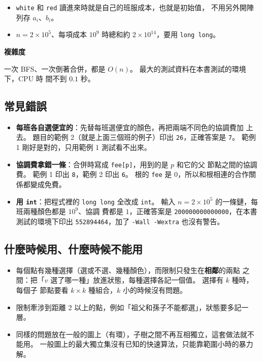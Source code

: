 
\begin{itemize}
\item \texttt{white} 和 \texttt{red} 讀進來時就是自己的班服成本，也就是初始值，
不用另外開陣列存 $a_i$、$b_i$。
\item $n = 2 \times 10^5$、每項成本 $10^9$ 時總和約 $2 \times 10^{14}$，要用
\texttt{long long}。
\end{itemize}

\textbf{複雜度}

一次 BFS、一次倒著合併，都是 $O(n)$。 最大的測試資料在本書測試的環境下，CPU 時
間不到 $0.1$ 秒。

\subsection{常見錯誤}

\begin{itemize}
\item \textbf{每班各自選便宜的}：先替每班選便宜的顏色，再把兩端不同色的協調費加
上去。 題目的範例 2（就是上面三個班的例子）印出 \texttt{26}，正確答案是
\texttt{7}。 範例 1 剛好是對的，只用範例 1 測試看不出來。
\item \textbf{協調費拿錯一條}：合併時寫成 \texttt{fee[p]}，用到的是 $p$ 和它的父
節點之間的協調費。 範例 1 印出 \texttt{8}，範例 2 印出 \texttt{6}。 根的
\texttt{fee} 是 $0$，所以和根相連的合作關係都變成免費。
\item \textbf{用 \texttt{int}}：把程式裡的 \texttt{long long} 全改成
\texttt{int}。 輸入 $n = 2 \times 10^5$ 的一條鏈，每班兩種顏色都是 $10^9$、協調
費都是 $1$，正確答案是 \texttt{200000000000000}，在本書測試的環境下印出
\texttt{552894464}，加了 \texttt{-Wall -Wextra} 也沒有警告。
\end{itemize}

\subsection{什麼時候用、什麼時候不能用}

\begin{itemize}
\item 每個點有幾種選擇（選或不選、幾種顏色），而限制只發生在\textbf{相鄰}的兩點
之間：把「$v$ 選了哪一種」放進狀態，每種選擇各記一個值。 選擇有 $k$ 種時，每個子
節點要看 $k \times k$ 種組合，$k$ 小的時候沒有問題。
\item 限制牽涉到距離 $2$ 以上的點，例如「祖父和孫子不能都選」，狀態要多記一層。
\item 同樣的問題放在一般的圖上（有環），子樹之間不再互相獨立，這套做法就不能用。
一般圖上的最大獨立集沒有已知的快速算法，只能靠範圍小時的暴力解。
\end{itemize}

